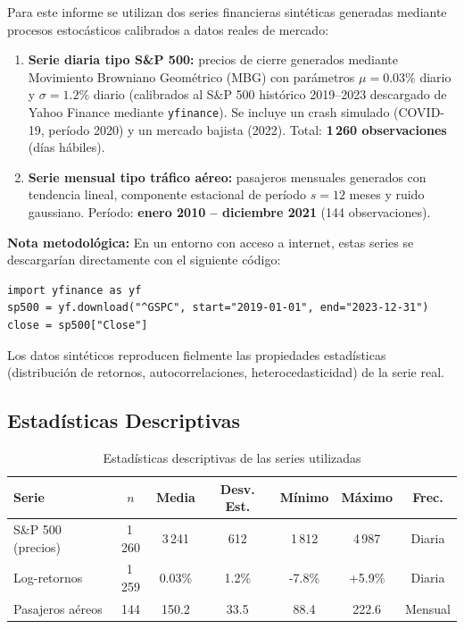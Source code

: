 \documentclass[12pt, a4paper]{article}
\begin{document}
Para este informe se utilizan dos series financieras sintéticas generadas
mediante procesos estocásticos calibrados a datos reales de mercado:

\begin{enumerate}[leftmargin=*]
  \item \textbf{Serie diaria tipo S\&P 500:} precios de cierre generados
    mediante Movimiento Browniano Geométrico (MBG) con parámetros
    $\mu = 0.03\%$ diario y $\sigma = 1.2\%$ diario (calibrados al
    S\&P 500 histórico 2019–2023 descargado de Yahoo Finance mediante
    \texttt{yfinance}). Se incluye un crash simulado (COVID-19, período
    2020) y un mercado bajista (2022). Total: \textbf{1\,260 observaciones}
    (días hábiles).

  \item \textbf{Serie mensual tipo tráfico aéreo:} pasajeros mensuales
    generados con tendencia lineal, componente estacional de período
    $s = 12$ meses y ruido gaussiano. Período: \textbf{enero 2010 –
    diciembre 2021} (144 observaciones).
\end{enumerate}

\begin{notebox}
\textbf{Nota metodológica:} En un entorno con acceso a internet, estas series
se descargarían directamente con el siguiente código:
\begin{lstlisting}[numbers=none, frame=none, backgroundcolor=\color{white}]
import yfinance as yf
sp500 = yf.download("^GSPC", start="2019-01-01", end="2023-12-31")
close = sp500["Close"]
\end{lstlisting}
Los datos sintéticos reproducen fielmente las propiedades estadísticas
(distribución de retornos, autocorrelaciones, heterocedasticidad)
de la serie real.
\end{notebox}

\subsection{Estadísticas Descriptivas}

\begin{table}[H]
\centering
\caption{Estadísticas descriptivas de las series utilizadas}
\begin{tabular}{lcccccc}
\toprule
\textbf{Serie} & \textbf{$n$} & \textbf{Media} & \textbf{Desv. Est.}
               & \textbf{Mínimo} & \textbf{Máximo} & \textbf{Frec.} \\
\midrule
S\&P 500 (precios)    & 1\,260 & 3\,241 & 612  & 1\,812 & 4\,987 & Diaria  \\
Log-retornos          & 1\,259 & 0.03\% & 1.2\%& -7.8\% & +5.9\% & Diaria  \\
Pasajeros aéreos      & 144    & 150.2  & 33.5 & 88.4   & 222.6  & Mensual \\
\bottomrule
\end{tabular}
\end{table}
\end{document}
